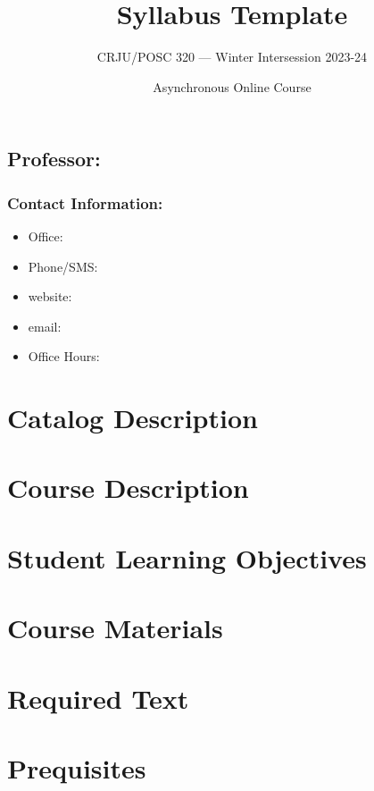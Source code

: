 \documentclass[12pt, letterpaper]{article}
\begin{document}
\title{\textbf{Syllabus Template}}

\author{CRJU/POSC 320 — Winter Intersession 2023-24}
\date{Asynchronous Online Course}

    \maketitle


\subsection*{Professor:}

\subsubsection*{Contact Information:}

\begin{itemize}
	\item Office: 
	\item Phone/SMS: 
	\item website: 
	\item email: 
	\item Office Hours:
\end{itemize}

\section*{Catalog Description}

\section*{Course Description}

\section*{Student Learning Objectives}

\section*{Course Materials}

\section*{Required Text}

\section*{Prequisites}
\end{document}
